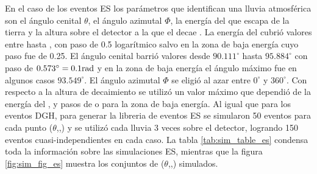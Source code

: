 		En el caso de los eventos ES los parámetros que identifican una lluvia atmosférica son el ángulo cenital $\theta$, el ángulo azimutal $\Phi$, la energía del \tauon{} que escapa de la tierra \etau{} y la altura sobre el detector a la que el \tauon{} decae \xd{}.
		La energía del \tauon{} cubrió valores entre  hasta , con paso de 0.5 logarítmico salvo en la zona de baja energía cuyo paso fue de 0.25.
		El ángulo cenital barrió valores desde $90.111^\circ$ hasta $95.884^\circ$ con paso de $0.573^\circ=0.1 \rm rad$ y en la zona de baja energía el ángulo máximo fue en algunos casos $93.549^\circ$.
		El ángulo azimutal $\Phi$ se eligió al azar entre $0^\circ$ y $360^\circ$.
		Con respecto a la altura de decaimiento \xd{} se utilizó un valor máximo que dependió de la energía del \tauon, y pasos de  o  para la zona de baja energía.
		Al igual que para los eventos DGH, para generar la libreria de eventos ES se simularon 50 eventos para cada punto ($\theta$,\etau{},\xd{}) y se utilizó cada lluvia 3 veces sobre el detector, logrando 150 eventos cuasi-independientes en cada caso. 
		La tabla \ref{tab:sim_table_es} condensa toda la información sobre las simulaciones ES, mientras que la figura \ref{fig:sim_fig_es} muestra los conjuntos de ($\theta$,\etau{},\xd{}) simulados.
